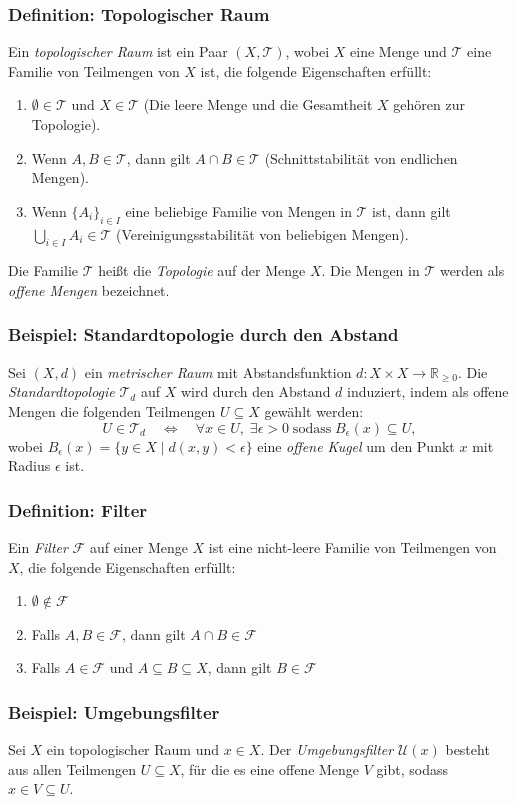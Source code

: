 \documentclass{beamer}
\begin{document}
 \begin{frame}
    \frametitle{Definition: Topologischer Raum}
    Ein \emph{topologischer Raum} ist ein Paar $(X, \mathcal{T})$, wobei $X$ eine Menge und $\mathcal{T}$ eine Familie von Teilmengen von $X$ ist, die folgende Eigenschaften erfüllt:
    \begin{enumerate}
        \item $\emptyset \in \mathcal{T}$ und $X \in \mathcal{T}$ (Die leere Menge und die Gesamtheit $X$ gehören zur Topologie).
        \item Wenn $A, B \in \mathcal{T}$, dann gilt $A \cap B \in \mathcal{T}$ (Schnittstabilität von endlichen Mengen).
        \item Wenn $\{A_i\}_{i \in I}$ eine beliebige Familie von Mengen in $\mathcal{T}$ ist, dann gilt $\bigcup_{i \in I} A_i \in \mathcal{T}$ (Vereinigungsstabilität von beliebigen Mengen).
    \end{enumerate}
    Die Familie $\mathcal{T}$ heißt die \emph{Topologie} auf der Menge $X$. Die Mengen in $\mathcal{T}$ werden als \emph{offene Mengen} bezeichnet.
\end{frame}

\begin{frame}
    \frametitle{Beispiel: Standardtopologie durch den Abstand}
    Sei $(X, d)$ ein \emph{metrischer Raum} mit Abstandsfunktion $d: X \times X \rightarrow \mathbb{R}_{\geq 0}$.
    Die \emph{Standardtopologie} $\mathcal{T}_d$ auf $X$ wird durch den Abstand $d$ induziert, indem als offene Mengen die folgenden Teilmengen $U \subseteq X$ gewählt werden:
    \[
    U \in \mathcal{T}_d \quad \Leftrightarrow \quad \forall x \in U, \; \exists \epsilon > 0 \; \text{sodass} \; B_\epsilon(x) \subseteq U,
    \]
    wobei $B_\epsilon(x) = \{ y \in X \mid d(x, y) < \epsilon \}$ eine \emph{offene Kugel} um den Punkt $x$ mit Radius $\epsilon$ ist.
\end{frame}


\begin{frame}
    \frametitle{Definition: Filter}
    Ein \emph{Filter} $\mathcal{F}$ auf einer Menge $X$ ist eine nicht-leere Familie von Teilmengen von $X$, die folgende Eigenschaften erfüllt:
    \begin{enumerate}
        \item $\emptyset \notin \mathcal{F}$
        \item Falls $A, B \in \mathcal{F}$, dann gilt $A \cap B \in \mathcal{F}$
        \item Falls $A \in \mathcal{F}$ und $A \subseteq B \subseteq X$, dann gilt $B \in \mathcal{F}$
    \end{enumerate}
\end{frame}

\begin{frame}
    \frametitle{Beispiel: Umgebungsfilter}
    Sei $X$ ein topologischer Raum und $x \in X$. Der \emph{Umgebungsfilter} $\mathcal{U}(x)$ besteht aus allen Teilmengen $U \subseteq X$, für die es eine offene Menge $V$ gibt, sodass $x \in V \subseteq U$.
\end{frame}
\end{document}
